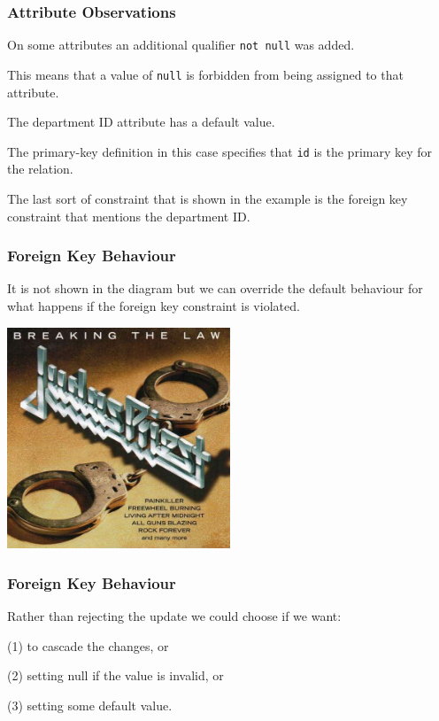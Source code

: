 \begin{frame}
\frametitle{Attribute Observations}

On some attributes an additional qualifier \texttt{not null} was added. 

This means that a value of \texttt{null} is forbidden from being assigned to that attribute. 

The department ID attribute has a default value.

The primary-key definition in this case specifies that \texttt{id} is the primary key for the relation.

The last sort of constraint that is shown in the example is the foreign key constraint that mentions the department ID.

\end{frame}

\begin{frame}
\frametitle{Foreign Key Behaviour}

It is not shown in the diagram but we can override the default behaviour for what happens if the foreign key constraint is violated. 

\begin{center}
	\includegraphics[width=0.5\textwidth]{images/breaking-the-law.jpg}
\end{center}

\end{frame}

\begin{frame}
\frametitle{Foreign Key Behaviour}

Rather than rejecting the update we could choose if we want:

(1) to cascade the changes, or 

(2) setting null if the value is invalid, or 

(3) setting some default value.

\end{frame}



